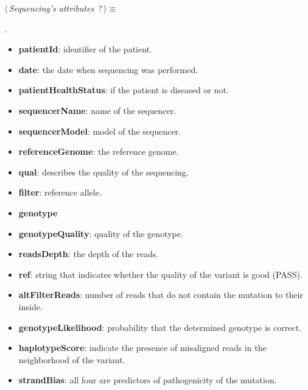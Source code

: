 	\begin{flushleft} \small
\begin{minipage}{\linewidth}\label{scrap10}\raggedright\small
{} $\langle\,${\itshape {Sequencing's attributes}}\nobreak\ {\footnotesize {?}}$\,\rangle\equiv$
\vspace{-1ex}
\begin{list}{}{} \item

                
        {\NWsep}
\end{list}
\vspace{-1.5ex}
\footnotesize
\begin{list}{}{\setlength{\itemsep}{-\parsep}\setlength{\itemindent}{-\leftmargin}}
\item {\NWtxtMacroNoRef}.

\item{}
\end{list}
\end{minipage}\vspace{4ex}
\end{flushleft}
\begin{itemize}
 	\item \textbf{patientId}: identifier of the patient.
 	\item \textbf{date}: the date when sequencing was performed.
 	\item \textbf{patientHealthStatus}: if the patient is diseased or not.
 	\item \textbf{sequencerName}: name of the sequencer.
 	\item \textbf{sequencerModel}: model of the sequencer.
 	\item \textbf{referenceGenome}: the reference genome.
 	\item \textbf{qual}: describes the quality of the sequencing.
 	\item \textbf{filter}: reference allele.
 	\item \textbf{genotype}
 	\item \textbf{genotypeQuality}: quality of the genotype.
 	\item \textbf{readsDepth}: the depth of the reads.
 	\item \textbf{ref}: string that indicates whether the quality of the variant is good (PASS).
 	\item \textbf{altFilterReads}: number of reads that do not contain the mutation to their inside.
 	\item \textbf{genotypeLikelihood}: probability that the determined genotype is correct.
 	\item \textbf{haplotypeScore}: indicate the presence of misaligned reads in the neighborhood of the variant.
 	\item \textbf{strandBias}: all four are predictors of pathogenicity of the mutation.
\end{itemize}

